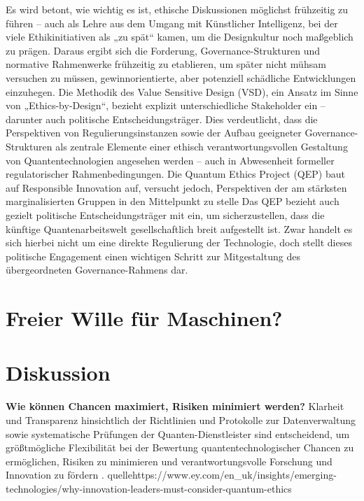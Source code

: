     Es wird betont, wie wichtig es ist, ethische Diskussionen möglichst frühzeitig zu führen – auch als Lehre aus dem Umgang mit Künstlicher Intelligenz, bei der viele Ethikinitiativen als „zu spät“ kamen, um die Designkultur noch maßgeblich zu prägen. Daraus ergibt sich die Forderung, Governance-Strukturen und normative Rahmenwerke frühzeitig zu etablieren, um später nicht mühsam versuchen zu müssen, gewinnorientierte, aber potenziell schädliche Entwicklungen einzuhegen.\cite{1-s2.0-S0370157324001078}
    Die Methodik des Value Sensitive Design (VSD), ein Ansatz im Sinne von „Ethics-by-Design“, bezieht explizit unterschiedliche Stakeholder ein – darunter auch politische Entscheidungsträger. Dies verdeutlicht, dass die Perspektiven von Regulierungsinstanzen sowie der Aufbau geeigneter Governance-Strukturen als zentrale Elemente einer ethisch verantwortungsvollen Gestaltung von Quantentechnologien angesehen werden – auch in Abwesenheit formeller regulatorischer Rahmenbedingungen. \cite{umbrello_quantum_2024}
    Die Quantum Ethics Project (QEP) baut auf Responsible Innovation auf, versucht jedoch, Perspektiven der am stärksten marginalisierten Gruppen in den Mittelpunkt zu stelle \cite{1-s2.0-S0370157324001078}
    Das QEP bezieht auch gezielt politische Entscheidungsträger mit ein, um sicherzustellen, dass die künftige Quantenarbeitswelt gesellschaftlich breit aufgestellt ist. Zwar handelt es sich hierbei nicht um eine direkte Regulierung der Technologie, doch stellt dieses politische Engagement einen wichtigen Schritt zur Mitgestaltung des übergeordneten Governance-Rahmens dar. \cite{1-s2.0-S0370157324001078}


\section{Freier Wille für Maschinen?}



\section{Diskussion}

\textbf{Wie können Chancen maximiert, Risiken minimiert werden?}
Klarheit und Transparenz hinsichtlich der Richtlinien und Protokolle zur Datenverwaltung sowie systematische Prüfungen der Quanten-Dienstleister sind entscheidend, um größtmögliche Flexibilität bei der Bewertung quantentechnologischer Chancen zu ermöglichen, Risiken zu minimieren und verantwortungsvolle Forschung und Innovation zu fördern .
quelle{https://www.ey.com/en_uk/insights/emerging-technologies/why-innovation-leaders-must-consider-quantum-ethics}


